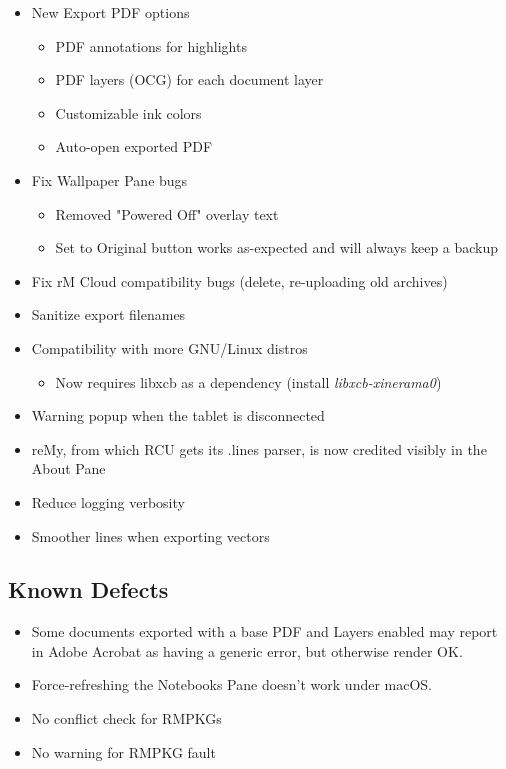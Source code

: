 \begin{itemize}
\item{New Export PDF options}
  \begin{itemize}
  \item{PDF annotations for highlights}
  \item{PDF layers (OCG) for each document layer}
  \item{Customizable ink colors}
  \item{Auto-open exported PDF}
  \end{itemize}
\item{Fix Wallpaper Pane bugs}
  \begin{itemize}
  \item{Removed "Powered Off" overlay text}
  \item{Set to Original button works as-expected and will always keep a backup}
  \end{itemize}
\item{Fix rM Cloud compatibility bugs (delete, re-uploading old archives)}
\item{Sanitize export filenames}
\item{Compatibility with more GNU/Linux distros}
  \begin{itemize}
  \item{Now requires libxcb as a dependency (install \textit{libxcb-xinerama0})}
  \end{itemize}
\item{Warning popup when the tablet is disconnected}
\item{reMy, from which RCU gets its .lines parser, is now credited visibly in the About Pane}
\item{Reduce logging verbosity}
\item{Smoother lines when exporting vectors}
\end{itemize}

\subsection{Known Defects}
\begin{itemize}
\item{Some documents exported with a base PDF and Layers enabled may report in Adobe Acrobat as having a generic error, but otherwise render OK.}
\item{Force-refreshing the Notebooks Pane doesn't work under macOS.}
\item{No conflict check for RMPKGs}
\item{No warning for RMPKG fault}
\end{itemize}



